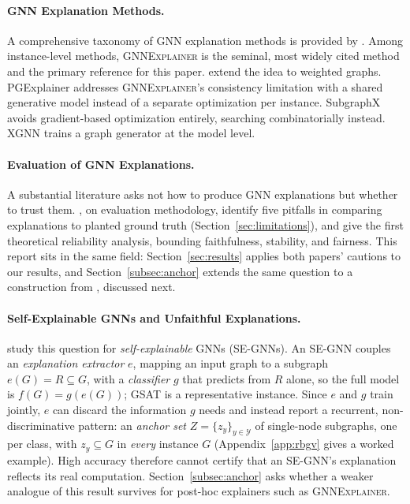 \documentclass{article}
\newcommand{\GNNEx}{\textsc{GNNExplainer}\xspace}
\newcommand{\calY}{\mathcal{Y}}
\theoremstyle{definition}
\begin{document}
\paragraph{GNN Explanation Methods.}
A comprehensive taxonomy of GNN explanation methods is provided by
\citet{yuan2022explainability}. Among instance-level methods, \GNNEx
\citep{ying2019gnnexplainer} is the seminal, most widely cited method and
the primary reference for this paper. \citet{li2020explain}
extend the idea to weighted graphs. PGExplainer \citep{luo2020parameterized}
addresses \GNNEx's consistency limitation with a shared generative model
instead of a separate optimization per instance. SubgraphX
\citep{yuan2021explainability} avoids gradient-based optimization entirely,
searching combinatorially instead. XGNN
\citep{yuan2020xgnn} trains a graph generator at the model level.

\paragraph{Evaluation of GNN Explanations.}
A substantial literature asks not how to produce GNN explanations but
whether to trust them. \citet{faber2021when}, on evaluation methodology,
identify five pitfalls in comparing explanations to planted ground truth
(Section~\ref{sec:limitations}), and \citet{agarwal2022probing} give the
first theoretical reliability analysis, bounding faithfulness, stability,
and fairness. This report sits in the same field: Section~\ref{sec:results}
applies both papers' cautions to our results, and Section~\ref{subsec:anchor}
extends the same question to a construction from
\citet{azzolin2026gnnexplanations}, discussed next.

\paragraph{Self-Explainable GNNs and Unfaithful Explanations.}
\citet{azzolin2026gnnexplanations} study this question for
\emph{self-explainable} GNNs (SE-GNNs). An SE-GNN couples an
\emph{explanation extractor} $e$, mapping an input graph to a subgraph
$e(G) = R \subseteq G$, with a \emph{classifier} $g$ that predicts from $R$
alone, so the full model is $f(G) = g(e(G))$; GSAT \citep{miao2022gsat} is a
representative instance. Since $e$ and $g$ train jointly, $e$ can discard the
information $g$ needs and instead report a recurrent, non-discriminative
pattern: an \emph{anchor set} $Z = \{z_y\}_{y \in \calY}$ of single-node
subgraphs, one per class, with $z_y \subseteq G$ in \emph{every} instance $G$
(Appendix~\ref{app:rbgv} gives a worked example). High accuracy therefore
cannot certify that an SE-GNN's explanation reflects its real computation.
Section~\ref{subsec:anchor} asks whether a weaker analogue of this result
survives for post-hoc explainers such as \GNNEx.
\end{document}
